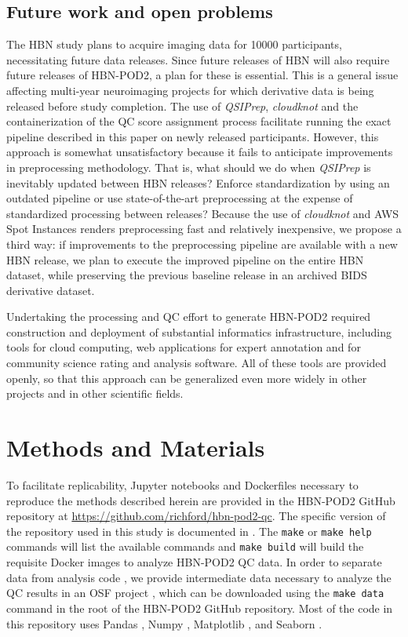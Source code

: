 \documentclass[9pt,lineno]{elife}
\begin{document}
\subsection{Future work and open problems}

The HBN study plans to acquire imaging data for \num{10000} participants,
necessitating future data releases. Since future releases of HBN will also require future releases of HBN-POD2, a plan for these is essential. This is
a general issue affecting multi-year neuroimaging projects for which derivative
data is being released before study completion. The use of \emph{QSIPrep},
\emph{cloudknot} and the containerization of the QC score assignment process
facilitate running the exact pipeline described in this paper on newly released
participants. However, this approach is somewhat unsatisfactory because it fails to
anticipate improvements in preprocessing methodology. That is, what should we do
when \emph{QSIPrep} is inevitably updated between HBN releases? Enforce
standardization by using an outdated pipeline or use state-of-the-art
preprocessing at the expense of standardized processing between releases?
Because the use of \emph{cloudknot} and AWS Spot Instances renders preprocessing
fast and relatively inexpensive, we propose a third way: if improvements to the
preprocessing pipeline are available with a new HBN release, we plan to execute
the improved pipeline on the entire HBN dataset, while preserving the previous
baseline release in an archived BIDS derivative dataset.

Undertaking the processing and QC effort to generate HBN-POD2 required
construction and deployment of substantial informatics infrastructure, including
tools for cloud computing, web applications for expert annotation and for
community science rating and analysis software. All of these tools are provided
openly, so that this approach can be generalized even more widely in other
projects and in other scientific fields.

\section{Methods and Materials}

To facilitate replicability, Jupyter notebooks \citep{kluyver2016jupyter} and
Dockerfiles \citep{merkel2014docker} necessary to reproduce the methods described
herein are provided in the HBN-POD2 GitHub repository at
\url{https://github.com/richford/hbn-pod2-qc}. The specific version of the
repository used in this study is documented in \cite{richiehalford2022hbnpod2qc}.
The \texttt{make} or \texttt{make help}
commands will list the available commands and \texttt{make build} will build the
requisite Docker images to analyze HBN-POD2 QC data. In order to separate data
from analysis code \citep{Wilson2017-rj}, we provide intermediate data necessary
to analyze the QC results in an OSF \citep{Foster-MSLS2017-rl} project
\citep{hbn-pod2-osf}, which can be downloaded using the \texttt{make data}
command in the root of the HBN-POD2 GitHub repository. Most of the code in this
repository uses Pandas \citep{mckinney-proc-scipy-2010,reback2020pandas}, Numpy
\citep{harris2020array}, Matplotlib \citep{hunter2007matplotlib}, and Seaborn
\citep{waskom2021seaborn}.
\end{document}
